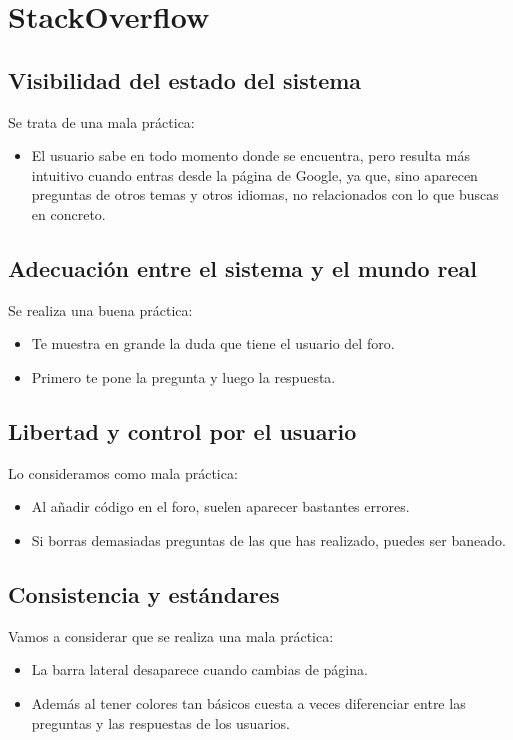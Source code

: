 \documentclass[openany,overnay,a4paper, twoside, 14pt]{book}
\begin{document}
\chapter*{StackOverflow}
\section*{Visibilidad del estado del sistema}
Se trata de una mala práctica:
\begin{itemize}
\item El usuario sabe en todo momento donde se encuentra, pero resulta más intuitivo cuando entras desde la página de Google, ya que, sino aparecen preguntas de otros temas y otros idiomas, no relacionados con lo que buscas en concreto.
\end{itemize}
\section*{Adecuación entre el sistema y el mundo real}
Se realiza una buena práctica:
\begin{itemize}
\item Te muestra en grande la duda que tiene el usuario del foro.
\item Primero te pone la pregunta y luego la respuesta.
\end{itemize}
\section*{Libertad y control por el usuario}
Lo consideramos como mala práctica:
\begin{itemize}
\item Al añadir código en el foro, suelen aparecer bastantes errores.
\item Si borras demasiadas preguntas de las que has realizado, puedes ser baneado.
\end{itemize}
\section*{Consistencia y estándares} 
Vamos a considerar que se realiza una mala práctica:
\begin{itemize}
\item La barra lateral desaparece cuando cambias de página.
\item Además al tener colores tan básicos cuesta a veces diferenciar entre las preguntas y las respuestas de los usuarios.
\end{itemize}
\end{document}

